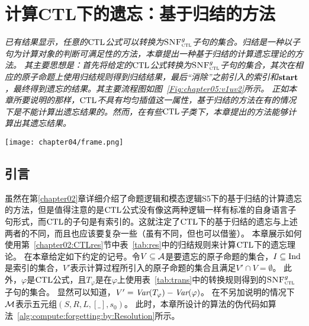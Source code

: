 \chapter{计算CTL下的遗忘：基于归结的方法}\label{chapter04}
{\em 
已有结果显示，任意的$\textrm{CTL}$公式可以转换为${\textsc{SNF}_{\textsc{ctl}}^g}$子句的集合。归结是一种以子句为计算对象的判断可满足性的方法，本章提出一种基于归结的计算遗忘理论的方法。
其主要思想是：首先将给定的$\textrm{CTL}$公式转换为${\textsc{SNF}_{\textsc{ctl}}^g}$子句的集合，其次在相应的原子命题上使用归结规则得到归结结果，最后“消除”之前引入的索引和$\textbf{start}$，最终得到遗忘的结果。其主要流程图如图~\ref{Fig:chapter05:v1uv2}所示。
正如本章所要说明的那样，$\textrm{CTL}$不具有均匀插值这一属性，基于归结的方法在有的情况下是不能计算出遗忘结果的。然而，在有些$\textrm{CTL}$子类下，本章提出的方法能够计算出其遗忘结果。}
\begin{figure*}[!htb]
	\centering
	\texttt{[image: chapter04/frame.png]}\\
	\caption{基于归结的遗忘的主要流程图}
	\label{Fig:chapter05:v1uv2}
\end{figure*}

\section{引言}
虽然在第\ref{chapter02}章详细介绍了命题逻辑和模态逻辑S5下的基于归结的计算遗忘的方法，但是值得注意的是$\textrm{CTL}$公式没有像这两种逻辑一样有标准的自身语言子句形式，而$\textrm{CTL}$的子句是有索引的。这就注定了$\textrm{CTL}$下的基于归结的遗忘与上述两者的不同，而且也应该要复杂一些（虽有不同，但也可以借鉴）。
本章展示如何使用第~\ref{chapter02:CTLres}节中表~\ref{tab:res}中的归结规则来计算$\textrm{CTL}$下的遗忘理论。
在本章给定如下约定的记号。令$V\subseteq {\cal A}$是要遗忘的原子命题的集合，$I\subseteq \textrm{Ind}$是索引的集合，$V'$表示计算过程所引入的原子命题的集合且满足$V'\cap V=\emptyset$。
此外，$\varphi$是$\textrm{CTL}$公式，且$T_{\varphi}$是在$\varphi$上使用表~\ref{tab:trans}中的转换规则得到的${\textsc{SNF}_{\textsc{ctl}}^g}$子句的集合。
显然可以知道，$V'=\textit{Var}(T_{\varphi})-\textit{Var}(\varphi)$。
在不另加说明的情况下${\cal M}$表示五元组$(S,R,L,[\_],s_0)$。
此时，本章所设计的算法的伪代码如算法~\ref{alg:compute:forgetting:by:Resolution}所示。


